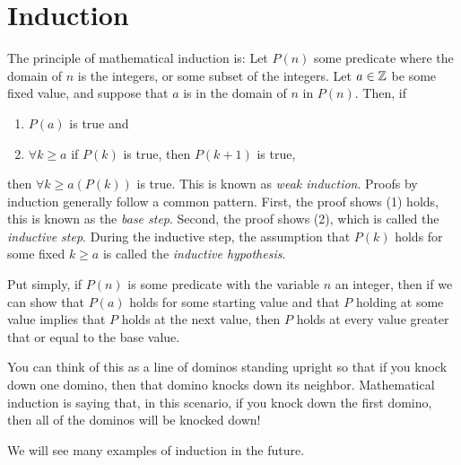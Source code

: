 \section{Induction}



The principle of mathematical induction is:
Let $P(n)$ some predicate where the domain of $n$ is the integers, or some subset of the integers.
Let $a\in\mathbb{Z}$ be some fixed value, and suppose that $a$ is in the domain of $n$ in $P(n)$.
Then, if
\begin{enumerate}
  \item $P(a)$ is true and
  \item $\forall k\geq a$ if $P(k)$ is true, then $P(k+1)$ is true,
\end{enumerate}
then $\forall k\geq a(P(k))$ is true.
This is known as \emph{weak induction}.
Proofs by induction generally follow a common pattern.
First, the proof shows (1) holds, this is known as the \emph{base step}.
Second, the proof shows (2), which is called the \emph{inductive step}.
During the inductive step, the assumption that $P(k)$ holds for some fixed $k\geq a$ is called the \emph{inductive hypothesis}.

Put simply, if $P(n)$ is some predicate with the variable $n$ an integer, then if we can show that $P(a)$ holds for some starting value and that $P$ holding at some value implies that $P$ holds at the next value, then $P$ holds at every value greater that or equal to the base value.

You can think of this as a line of dominos standing upright so that if you knock down one domino, then that domino knocks down its neighbor.
Mathematical induction is saying that, in this scenario, if you knock down the first domino, then all of the dominos will be knocked down!

We will see many examples of induction in the future.






